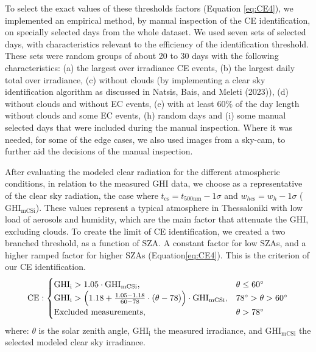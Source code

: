 \documentclass[
]{article}
\begin{document}
To select the exact values of these thresholds factors (Equation \ref{eq:CE4}), we
implemented an empirical method, by manual inspection of the CE identification, on
specially selected days from the whole dataset. We used seven sets of selected days,
with characteristics relevant to the efficiency of the identification threshold.
These sets were random groups of about 20 to 30 days with the following
characteristics:
(a) the largest over irradiance CE events,
(b) the largest daily total over irradiance,
(c) without clouds (by implementing a clear sky identification algorithm as discussed in Natsis, Bais, and Meleti (2023)),
(d) without clouds and without EC events,
(e) with at least \(60\%\) of the day length without clouds and some EC events,
(h) random days and
(i) some manual selected days that were included during the manual inspection.
Where it was needed, for some of the edge cases, we also used images from a sky-cam,
to further aid the decisions of the manual inspection.

After evaluating the modeled clear radiation for the different atmospheric
conditions, in relation to the measured GHI data, we choose as a representative of
the clear sky radiation, the case where
\(t_{\text{cs}} = t_{500\text{nm}} - 1\sigma\) and \(w_{h\text{cs}} = w_h - 1\sigma\)
(\(\text{GHI}_\text{mCSi}\)).
These values represent a typical atmosphere in Thessaloniki with low load of aerosols
and humidity, which are the main factor that attenuate the GHI, excluding clouds. To
create the limit of CE identification, we created a two branched threshold, as a
function of SZA. A constant factor for low SZAs, and a higher ramped factor for
higher SZAs (Equation\nobreakspace\ref{eq:CE4}).
This is the criterion of our CE identification.
\begin{equation}
\text{CE} : \begin{cases}
 \text{GHI}_\text{i} > 1.05 \cdot \text{GHI}_\text{mCSi}, & \text{$\theta \leq 60^\circ$}\\
\text{GHI}_\text{i} > \left ({ 1.18 + \frac{1.05 - 1.18}{60 - 78} \cdot (\theta- 78) } \right ) \cdot \text{GHI}_\text{mCSi}, & \text{$ 78^\circ > \theta > 60^\circ$}\\
\text{Excluded measurements}, & \theta > 78^\circ
\end{cases}\label{eq:CE4}
\end{equation}
where: \(\theta\) is the solar zenith angle, \(\text{GHI}_\text{i}\) the measured
irradiance, and \(\text{GHI}_\text{mCSi}\) the selected modeled clear sky irradiance.
\end{document}
